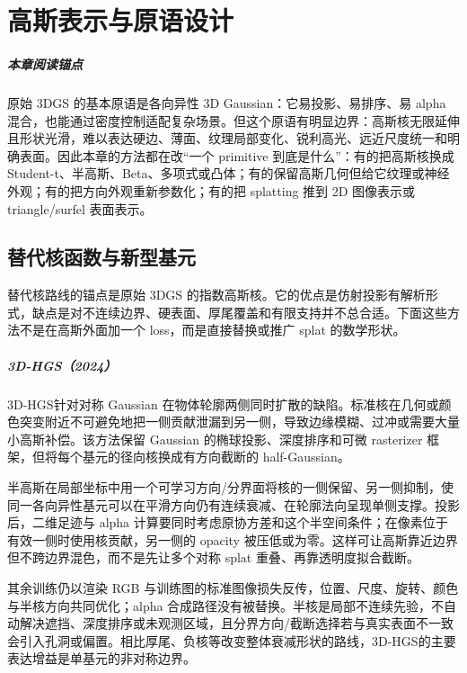 \chapter{高斯表示与原语设计}

\paragraph*{本章阅读锚点}
原始 3DGS 的基本原语是各向异性 3D Gaussian：它易投影、易排序、易 alpha 混合，也能通过密度控制适配复杂场景。但这个原语有明显边界：高斯核无限延伸且形状光滑，难以表达硬边、薄面、纹理局部变化、锐利高光、远近尺度统一和明确表面。因此本章的方法都在改“一个 primitive 到底是什么”：有的把高斯核换成 Student-t、半高斯、Beta、多项式或凸体；有的保留高斯几何但给它纹理或神经外观；有的把方向外观重新参数化；有的把 splatting 推到 2D 图像表示或 triangle/surfel 表面表示。

\section{替代核函数与新型基元}

替代核路线的锚点是原始 3DGS 的指数高斯核。它的优点是仿射投影有解析形式，缺点是对不连续边界、硬表面、厚尾覆盖和有限支持并不总合适。下面这些方法不是在高斯外面加一个 loss，而是直接替换或推广 splat 的数学形状。

\paragraph{3D-HGS（2024）\cite{2406_02720}}
3D-HGS针对对称 Gaussian 在物体轮廓两侧同时扩散的缺陷。标准核在几何或颜色突变附近不可避免地把一侧贡献泄漏到另一侧，导致边缘模糊、过冲或需要大量小高斯补偿。该方法保留 Gaussian 的椭球投影、深度排序和可微 rasterizer 框架，但将每个基元的径向核换成有方向截断的 half-Gaussian。

半高斯在局部坐标中用一个可学习方向/分界面将核的一侧保留、另一侧抑制，使同一各向异性基元可以在平滑方向仍有连续衰减、在轮廓法向呈现单侧支撑。投影后，二维足迹与 alpha 计算要同时考虑原协方差和这个半空间条件；在像素位于有效一侧时使用核贡献，另一侧的 opacity 被压低或为零。这样可让高斯靠近边界但不跨边界混色，而不是先让多个对称 splat 重叠、再靠透明度拟合截断。

其余训练仍以渲染 RGB 与训练图的标准图像损失反传，位置、尺度、旋转、颜色与半核方向共同优化；alpha 合成路径没有被替换。半核是局部不连续先验，不自动解决遮挡、深度排序或未观测区域，且分界方向/截断选择若与真实表面不一致会引入孔洞或偏置。相比厚尾、负核等改变整体衰减形状的路线，3D-HGS的主要表达增益是单基元的非对称边界。

